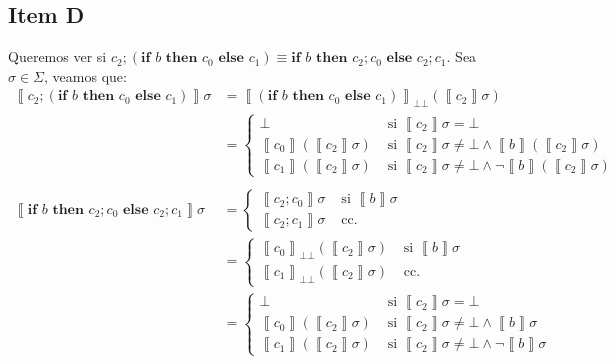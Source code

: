 \documentclass{article}
\newcommand{\sem}[1]{\left\llbracket #1\right\rrbracket}
\newcommand{\bbot}{\bot\!\!\!\bot}
\newcommand{\cif}[3]{\textbf{if }#1\textbf{ then }#2\textbf{ else }#3}
\begin{document}
\subsection*{Item D}
Queremos ver si $c_2; (\cif{b}{c_0}{c_1}) \equiv \cif{b}{c_2; c_0}{c_2; c_1}$.
Sea $\sigma \in \Sigma$, veamos que:
\begin{equation*}
  \begin{aligned}
    \sem{c_2; (\cif{b}{c_0}{c_1})}\sigma &= \sem{(\cif{b}{c_0}{c_1})}_{\bbot}(\sem{c_2}\sigma) \\ 
                                         &= \begin{cases}
                                           \bot & \text{ si }\sem{c_2}\sigma = \bot \\ 
                                           \sem{c_0}(\sem{c_2}\sigma) & \text{ si }\sem{c_2}\sigma \neq \bot \land \sem{b}(\sem{c_2}\sigma) \\ 
                                           \sem{c_1}(\sem{c_2}\sigma) & \text{ si }\sem{c_2}\sigma \neq \bot \land \neg\sem{b}(\sem{c_2}\sigma)
                                         \end{cases} \\ 
                                         \\ 
    \sem{\cif{b}{c_2;c_0}{c_2;c_1}}\sigma &= \begin{cases}
                                      \sem{c_2; c_0}\sigma &\text{ si }\sem{b}\sigma \\ 
                                      \sem{c_2; c_1}\sigma &\text{ cc. }
                                    \end{cases} \\ 
                                  &= \begin{cases}
                                      \sem{c_0}_{\bbot}(\sem{c_2}\sigma) & \text{ si }\sem{b}\sigma \\ 
                                      \sem{c_1}_{\bbot}(\sem{c_2}\sigma) & \text{ cc. }
                                    \end{cases} \\ 
                                  &= \begin{cases}
                                    \bot & \text{ si }\sem{c_2}\sigma = \bot \\ 
                                    \sem{c_0}(\sem{c_2}\sigma) & \text{ si }\sem{c_2}\sigma \neq \bot \land \sem{b}\sigma \\ 
                                    \sem{c_1}(\sem{c_2}\sigma) & \text{ si }\sem{c_2}\sigma \neq \bot \land \neg\sem{b}\sigma
                                  \end{cases}
  \end{aligned}
\end{equation*}
\end{document}
